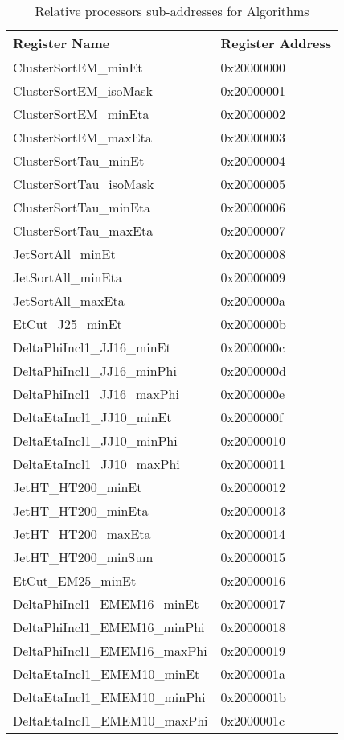 %
\begin {table}[H]
\caption {Relative processors sub-addresses for Algorithms} 
\label{tab_low_reg}
\begin{tabular}{|l|l|}
\hline
Register Name & Register Address \\
\hline
ClusterSortEM\_minEt & 0x20000000 \\ 
ClusterSortEM\_isoMask & 0x20000001 \\ 
ClusterSortEM\_minEta & 0x20000002 \\ 
ClusterSortEM\_maxEta & 0x20000003 \\ 
ClusterSortTau\_minEt & 0x20000004 \\ 
ClusterSortTau\_isoMask & 0x20000005 \\ 
ClusterSortTau\_minEta & 0x20000006 \\ 
ClusterSortTau\_maxEta & 0x20000007 \\ 
JetSortAll\_minEt & 0x20000008 \\ 
JetSortAll\_minEta & 0x20000009 \\ 
JetSortAll\_maxEta & 0x2000000a \\ 
EtCut\_J25\_minEt & 0x2000000b \\ 
DeltaPhiIncl1\_JJ16\_minEt & 0x2000000c \\ 
DeltaPhiIncl1\_JJ16\_minPhi & 0x2000000d \\ 
DeltaPhiIncl1\_JJ16\_maxPhi & 0x2000000e \\ 
DeltaEtaIncl1\_JJ10\_minEt & 0x2000000f \\ 
DeltaEtaIncl1\_JJ10\_minPhi & 0x20000010 \\ 
DeltaEtaIncl1\_JJ10\_maxPhi & 0x20000011 \\ 
JetHT\_HT200\_minEt & 0x20000012 \\ 
JetHT\_HT200\_minEta & 0x20000013 \\ 
JetHT\_HT200\_maxEta & 0x20000014 \\ 
JetHT\_HT200\_minSum & 0x20000015 \\ 
EtCut\_EM25\_minEt & 0x20000016 \\ 
DeltaPhiIncl1\_EMEM16\_minEt & 0x20000017 \\ 
DeltaPhiIncl1\_EMEM16\_minPhi & 0x20000018 \\ 
DeltaPhiIncl1\_EMEM16\_maxPhi & 0x20000019 \\ 
DeltaEtaIncl1\_EMEM10\_minEt & 0x2000001a \\ 
DeltaEtaIncl1\_EMEM10\_minPhi & 0x2000001b \\ 
DeltaEtaIncl1\_EMEM10\_maxPhi & 0x2000001c \\ 

\end{tabular}
\end{table}
